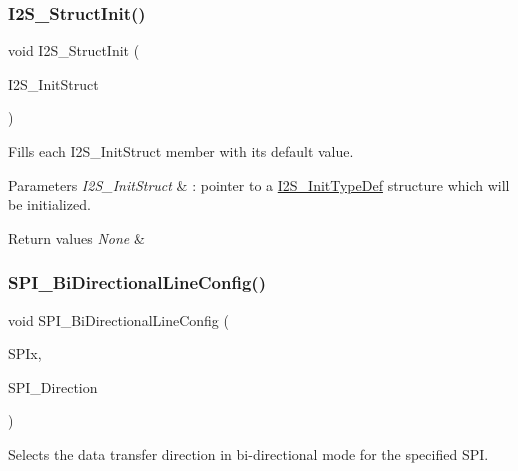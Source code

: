\subsubsection{\texorpdfstring{I2S\_StructInit()}{I2S\_StructInit()}}
{\footnotesize\ttfamily void I2\+S\+\_\+\+Struct\+Init (\begin{DoxyParamCaption}\item[{\mbox{\hyperlink{struct_i2_s___init_type_def}{I2\+S\+\_\+\+Init\+Type\+Def}} $\ast$}]{I2\+S\+\_\+\+Init\+Struct }\end{DoxyParamCaption})}



Fills each I2\+S\+\_\+\+Init\+Struct member with its default value. 


\begin{DoxyParams}{Parameters}
{\em I2\+S\+\_\+\+Init\+Struct} & \+: pointer to a \mbox{\hyperlink{struct_i2_s___init_type_def}{I2\+S\+\_\+\+Init\+Type\+Def}} structure which will be initialized. \\
\hline
\end{DoxyParams}

\begin{DoxyRetVals}{Return values}
{\em None} & \\
\hline
\end{DoxyRetVals}
\mbox{\label{group___s_p_i___exported___functions_ga166171c421fc51da7714723524d41b45}} 
\subsubsection{\texorpdfstring{SPI\_BiDirectionalLineConfig()}{SPI\_BiDirectionalLineConfig()}}
{\footnotesize\ttfamily void S\+P\+I\+\_\+\+Bi\+Directional\+Line\+Config (\begin{DoxyParamCaption}\item[{\mbox{\hyperlink{struct_s_p_i___type_def}{S\+P\+I\+\_\+\+Type\+Def}} $\ast$}]{S\+P\+Ix,  }\item[{uint16\+\_\+t}]{S\+P\+I\+\_\+\+Direction }\end{DoxyParamCaption})}



Selects the data transfer direction in bi-\/directional mode for the specified S\+PI. 


